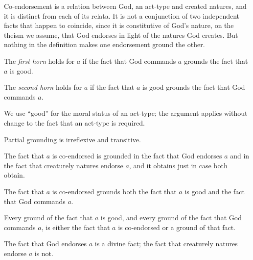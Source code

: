 \documentclass{situationist-preprint}
\begin{document}
Co-endorsement is a relation between God, an act-type and created natures, and it is distinct from each of its relata. It is not a conjunction of two independent facts that happen to coincide, since it is constitutive of God's nature, on the theism we assume, that God endorses in light of the natures God creates. But nothing in the definition makes one endorsement ground the other.

\begin{definition}\label{d:first}
The \emph{first horn} holds for $a$ if the fact that God commands $a$ grounds the fact that $a$ is good.
\end{definition}

\begin{definition}\label{d:second}
The \emph{second horn} holds for $a$ if the fact that $a$ is good grounds the fact that God commands $a$.
\end{definition}

We use \enquote{good} for the moral status of an act-type; the argument applies without change to the fact that an act-type is required.

\begin{assumption}\label{a:order}
Partial grounding is irreflexive and transitive.
\end{assumption}

\begin{assumption}\label{a:coend}
The fact that $a$ is co-endorsed is grounded in the fact that God endorses $a$ and in the fact that creaturely natures endorse $a$, and it obtains just in case both obtain.
\end{assumption}

\begin{assumption}\label{a:joint}
The fact that $a$ is co-endorsed grounds both the fact that $a$ is good and the fact that God commands $a$.
\end{assumption}

\begin{assumption}\label{a:exhaust}
Every ground of the fact that $a$ is good, and every ground of the fact that God commands $a$, is either the fact that $a$ is co-endorsed or a ground of that fact.
\end{assumption}

\begin{assumption}\label{a:divine}
The fact that God endorses $a$ is a divine fact; the fact that creaturely natures endorse $a$ is not.
\end{assumption}
\end{document}

